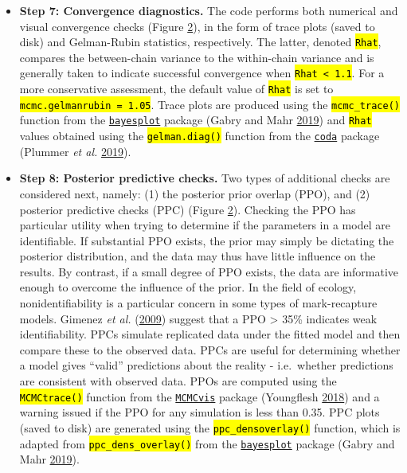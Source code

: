 \documentclass[
]{article}
\begin{document}
\begin{itemize}
\item
  \textbf{Step 7: Convergence diagnostics.} The code performs both numerical and visual convergence checks (Figure \hyperlink{fig2}{2}), in the form of trace plots (saved to disk) and Gelman-Rubin statistics, respectively. The latter, denoted \textcolor{codecolor}{\texttt{\hl{Rhat}}}, compares the between-chain variance to the within-chain variance and is generally taken to indicate successful convergence when \textcolor{codecolor}{\texttt{\hl{Rhat < 1.1}}}. For a more conservative assessment, the default value of \textcolor{codecolor}{\texttt{\hl{Rhat}}} is set to \textcolor{codecolor}{\texttt{\hl{mcmc.gelmanrubin = 1.05}}}. Trace plots are produced using the \textcolor{codecolor}{\texttt{\hl{mcmc\_trace()}}} function from the \href{https://cran.r-project.org/web/packages/bayesplot/index.html}{\texttt{bayesplot}} package (Gabry and Mahr \protect\hyperlink{ref-Gabry2019}{2019}) and \textcolor{codecolor}{\texttt{\hl{Rhat}}} values obtained using the \textcolor{codecolor}{\texttt{\hl{gelman.diag()}}} function from the \href{https://cran.r-project.org/web/packages/coda/index.html}{\texttt{coda}} package (Plummer \emph{et al.} \protect\hyperlink{ref-Plummer2019b}{2019}).
\item
  \textbf{Step 8: Posterior predictive checks.} Two types of additional checks are considered next, namely: (1) the posterior prior overlap (PPO), and (2) posterior predictive checks (PPC) (Figure \hyperlink{fig2}{2}). Checking the PPO has particular utility when trying to determine if the parameters in a model are identifiable. If substantial PPO exists, the prior may simply be dictating the posterior distribution, and the data may thus have little influence on the results. By contrast, if a small degree of PPO exists, the data are informative enough to overcome the influence of the prior. In the field of ecology, nonidentifiability is a particular concern in some types of mark-recapture models. Gimenez \emph{et al.} (\protect\hyperlink{ref-Gimenez2009}{2009}) suggest that a PPO \textgreater{} 35\% indicates weak identifiability. PPCs simulate replicated data under the fitted model and then compare these to the observed data. PPCs are useful for determining whether a model gives ``valid'' predictions about the reality - i.e.~whether predictions are consistent with observed data. PPOs are computed using the \textcolor{codecolor}{\texttt{\hl{MCMCtrace()}}} function from the \href{https://cran.r-project.org/web/packages/MCMCvis/index.html}{\texttt{MCMCvis}} package (Youngflesh \protect\hyperlink{ref-Youngflesh2018}{2018}) and a warning issued if the PPO for any simulation is less than 0.35. PPC plots (saved to disk) are generated using the \textcolor{codecolor}{\texttt{\hl{ppc\_densoverlay()}}} function, which is adapted from \textcolor{codecolor}{\texttt{\hl{ppc\_dens\_overlay()}}} from the \href{https://cran.r-project.org/web/packages/bayesplot/index.html}{\texttt{bayesplot}} package (Gabry and Mahr \protect\hyperlink{ref-Gabry2019}{2019}).

\end{itemize}
\end{document}
